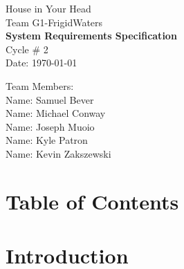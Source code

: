 \documentclass{article}
\begin{document}
\begin{titlepage}
    \begin{center}
        \begin{huge}
        House in Your Head \\[1cm]
        Team G1-FrigidWaters \\[2.2cm]
        { \bfseries System Requirements Specification } \\[1cm]
        Cycle \# 2\\[2.2cm]
        Date: \required\today\\[1cm]
        \end{huge}
    \end{center}
    \null \vfill
    \begin{large}
        Team Members: \\[0.5cm]
        Name: Samuel Bever\\[0.5cm]
        Name: Michael Conway\\[0.5cm]
        Name: Joseph Muoio\\[0.5cm]
        Name: Kyle Patron\\[0.5cm]
        Name: Kevin Zakszewski
    \end{large}
\end{titlepage}
\section*{\centering Table of Contents}
\makeatletter
{}
\newcommand{\hsubsubsection}{
\@startsection{subsubsection}{3}{\z@}%
                                     {-3.25ex\@plus -1ex \@minus -.2ex}%
                                     {-1.5ex \@plus -.2ex}%
                                     {R\normalfont\normalsize}}
\newcommand{\hparagraph}{
\@startsection{paragraph}{4}{\z@}%
                                     {-3.25ex\@plus -1ex \@minus -.2ex}%
                                     {-1.5ex \@plus -.2ex}%
                                     {R\normalfont\normalsize}}
\newcommand{\hsubparagraph}{
\@startsection{subparagraph}{5}{\z@}%
                                     {-3.25ex\@plus -1ex \@minus -.2ex}%
                                     {-1.5ex \@plus -.2ex}%
                                     {R\normalfont\normalsize}}
\setcounter{secnumdepth}{5}
\makeatother
\newpage
 

\section{Introduction}
\end{document}
